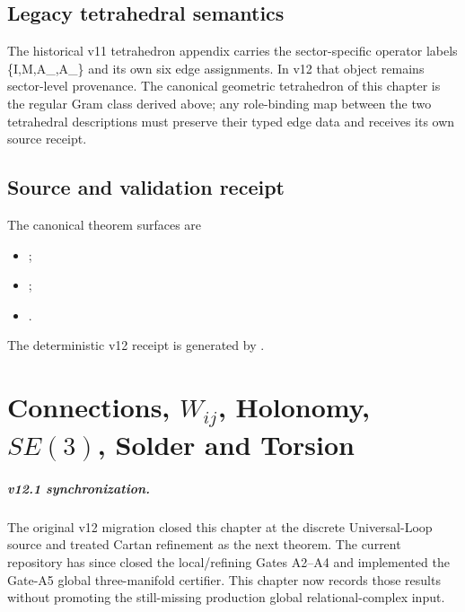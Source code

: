 \documentclass[11pt,a4paper,twoside]{book}
\def\({}%
\def\){}%
\theoremstyle{definition}
\begin{document}
\section{Legacy tetrahedral semantics}

The historical v11 tetrahedron appendix carries the sector-specific
operator labels
\(\{\hat I,\hat M,\hat A_\mu,\hat A_\tau\}\) and its own six edge assignments.
In v12 that object remains sector-level provenance.  The canonical geometric
tetrahedron of this chapter is the regular Gram class derived above; any
role-binding map between the two tetrahedral descriptions must preserve their
typed edge data and receives its own source receipt.

\section{Source and validation receipt}

The canonical theorem surfaces are
\begin{itemize}
\item {};
\item {};
\item {}.
\end{itemize}
The deterministic v12 receipt is generated by
.

\clearpage

\chapter[Connections, Holonomy, SE(3), Solder and Torsion]{Connections, $W_{ij}$, Holonomy, $SE(3)$, Solder and Torsion}
\label{ch:v12_connections_holonomy}

\paragraph{v12.1 synchronization.}
The original v12 migration closed this chapter at the discrete Universal-Loop
source and treated Cartan refinement as the next theorem.  The current
repository has since closed the local/refining Gates A2--A4 and implemented the
Gate-A5 global three-manifold certifier.  This chapter now records those results
without promoting the still-missing production global relational-complex input.
\end{document}
